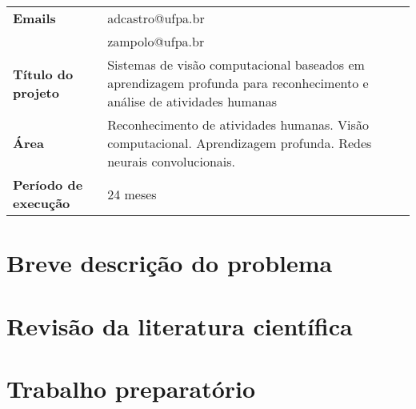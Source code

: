 \begin{table}[!th]
\begin{tabular}{|l p{}|}
\textbf{Emails}               & adcastro@ufpa.br\\
	                      & zampolo@ufpa.br\\
\textbf{Título do projeto}    & Sistemas de visão computacional baseados em aprendizagem profunda para reconhecimento e análise de atividades humanas\\
\textbf{Área}                 & Reconhecimento de atividades humanas. Visão computacional. Aprendizagem profunda. Redes neurais convolucionais.\\
\textbf{Período de execução}  & 24 meses\\
\hline
\end{tabular}
\end{table}
\newpage

\tableofcontents\newpage


%

\section{Breve descrição do problema}
\label{sec:descr}

\newpage

\section{Revisão da literatura científica}
\label{sec:rev}

\newpage

\section{Trabalho preparatório}
\label{sec:prep}
%
\newpage

